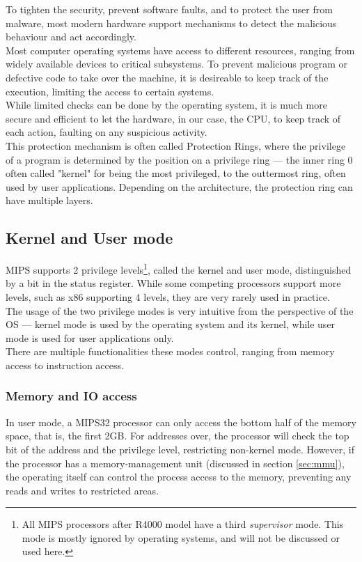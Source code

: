\label{sec:privileges}
To tighten the security, prevent software faults, and to protect the user from
malware, most modern hardware support mechanisms to detect the malicious behaviour
and act accordingly.\\
Most computer operating systems have access to different resources, ranging from
widely available devices to critical subsystems. To prevent malicious
program or defective code to take over the machine, it is desireable to keep
track of the execution, limiting the access to certain systems.\\
While limited checks can be done by the operating system, it is much more
secure and efficient to let the hardware, in our case, the CPU, to keep track
of each action, faulting on any suspicious activity.\\
This protection mechanism is often called Protection Rings, where the privilege
of a program is determined by the position on a privilege ring --- the inner ring 0
often called "kernel" for being the most privileged, to the outtermost ring,
often used by user applications\cite{see_mips_run}. Depending on the architecture, the protection
ring can have multiple layers.

\subsection{Kernel and User mode}
MIPS supports 2 privilege levels\footnote{All MIPS processors after R4000 model have a
third \textit{supervisor} mode. This mode is mostly ignored by operating systems,
and will not be discussed or used here.\cite{see_mips_run}}, called the kernel and user mode,
distinguished by a bit in the status register. While some competing processors support
more levels, such as x86 supporting 4\cite{intelmanual} levels, they are very
rarely used in practice.\\
The usage of the two privilege modes is very intuitive from the perspective of
the OS --- kernel mode is used
by the operating system and its kernel, while user mode is used for user
applications only.\\
There are multiple functionalities these modes control, ranging from memory access
to instruction access.

\subsubsection{Memory and IO access}
In user mode, a MIPS32 processor can only access the bottom half of the memory
space, that is, the first 2GB. For addresses over, the processor will check
the top bit of the address and the privilege level, restricting non-kernel mode.
However, if the processor has a memory-management unit (discussed in section \ref{sec:mmu}),
the operating itself can control the process access to the memory, preventing
any reads and writes to restricted areas.


